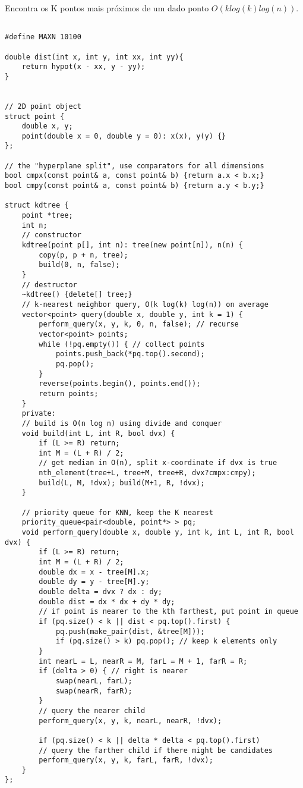 Encontra os K pontos mais próximos de um dado ponto $O(k log(k) log(n))$.
\begin{multicols}{2}
	\begin{lstlisting}

#define MAXN 10100

double dist(int x, int y, int xx, int yy){
	return hypot(x - xx, y - yy);
}


// 2D point object
struct point {
	double x, y;
	point(double x = 0, double y = 0): x(x), y(y) {}	
};

// the "hyperplane split", use comparators for all dimensions
bool cmpx(const point& a, const point& b) {return a.x < b.x;}
bool cmpy(const point& a, const point& b) {return a.y < b.y;}

struct kdtree {
	point *tree;
	int n;
	// constructor
	kdtree(point p[], int n): tree(new point[n]), n(n) {
		copy(p, p + n, tree);
		build(0, n, false);
	}
	// destructor
	~kdtree() {delete[] tree;}
	// k-nearest neighbor query, O(k log(k) log(n)) on average
	vector<point> query(double x, double y, int k = 1) {
		perform_query(x, y, k, 0, n, false); // recurse
		vector<point> points;
		while (!pq.empty()) { // collect points
			points.push_back(*pq.top().second);
			pq.pop();
		}
		reverse(points.begin(), points.end());
		return points;
	}
	private:
	// build is O(n log n) using divide and conquer
	void build(int L, int R, bool dvx) {
		if (L >= R) return;
		int M = (L + R) / 2;
		// get median in O(n), split x-coordinate if dvx is true
		nth_element(tree+L, tree+M, tree+R, dvx?cmpx:cmpy);
		build(L, M, !dvx); build(M+1, R, !dvx);
	}
	
	// priority queue for KNN, keep the K nearest
	priority_queue<pair<double, point*> > pq;
	void perform_query(double x, double y, int k, int L, int R, bool dvx) {
		if (L >= R) return;
		int M = (L + R) / 2;
		double dx = x - tree[M].x;
		double dy = y - tree[M].y;
		double delta = dvx ? dx : dy;
		double dist = dx * dx + dy * dy;
		// if point is nearer to the kth farthest, put point in queue
		if (pq.size() < k || dist < pq.top().first) {
			pq.push(make_pair(dist, &tree[M]));
			if (pq.size() > k) pq.pop(); // keep k elements only
		}
		int nearL = L, nearR = M, farL = M + 1, farR = R;
		if (delta > 0) { // right is nearer
			swap(nearL, farL);
			swap(nearR, farR);
		}
		// query the nearer child
		perform_query(x, y, k, nearL, nearR, !dvx);
		
		if (pq.size() < k || delta * delta < pq.top().first)
		// query the farther child if there might be candidates
		perform_query(x, y, k, farL, farR, !dvx);
	}
};
\end{lstlisting}
\end{multicols}

